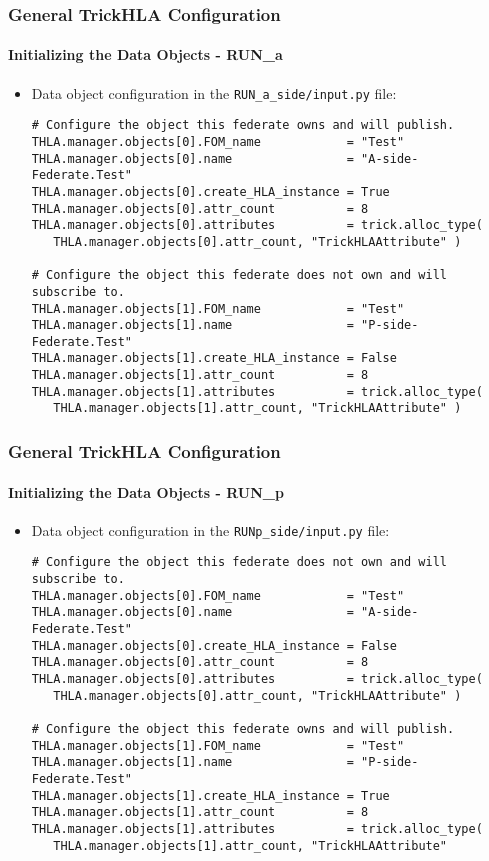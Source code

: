    \begin{frame}[fragile]
      \frametitle{General TrickHLA Configuration}
      \framesubtitle{Initializing the Data Objects - RUN\_a}
      \begin{itemize}
         \item Data object configuration in the \texttt{RUN\_a\_side/input.py} file:
\begin{Verbatim}[frame=single, fontsize=\scriptsize]
# Configure the object this federate owns and will publish.
THLA.manager.objects[0].FOM_name            = "Test"
THLA.manager.objects[0].name                = "A-side-Federate.Test"
THLA.manager.objects[0].create_HLA_instance = True
THLA.manager.objects[0].attr_count          = 8
THLA.manager.objects[0].attributes          = trick.alloc_type(
   THLA.manager.objects[0].attr_count, "TrickHLAAttribute" )

# Configure the object this federate does not own and will subscribe to.
THLA.manager.objects[1].FOM_name            = "Test"
THLA.manager.objects[1].name                = "P-side-Federate.Test"
THLA.manager.objects[1].create_HLA_instance = False
THLA.manager.objects[1].attr_count          = 8
THLA.manager.objects[1].attributes          = trick.alloc_type(
   THLA.manager.objects[1].attr_count, "TrickHLAAttribute" )
\end{Verbatim}
      \end{itemize}
   \end{frame}
   
   \begin{frame}[fragile]
      \frametitle{General TrickHLA Configuration}
      \framesubtitle{Initializing the Data Objects - RUN\_p}
      \begin{itemize}
         \item Data object configuration in the \texttt{RUNp\_side/input.py} file:
\begin{Verbatim}[frame=single, fontsize=\scriptsize]
# Configure the object this federate does not own and will subscribe to.
THLA.manager.objects[0].FOM_name            = "Test"
THLA.manager.objects[0].name                = "A-side-Federate.Test"
THLA.manager.objects[0].create_HLA_instance = False
THLA.manager.objects[0].attr_count          = 8
THLA.manager.objects[0].attributes          = trick.alloc_type(
   THLA.manager.objects[0].attr_count, "TrickHLAAttribute" )

# Configure the object this federate owns and will publish.
THLA.manager.objects[1].FOM_name            = "Test"
THLA.manager.objects[1].name                = "P-side-Federate.Test"
THLA.manager.objects[1].create_HLA_instance = True
THLA.manager.objects[1].attr_count          = 8
THLA.manager.objects[1].attributes          = trick.alloc_type(
   THLA.manager.objects[1].attr_count, "TrickHLAAttribute" 
\end{Verbatim}
      \end{itemize}
   \end{frame}
   
